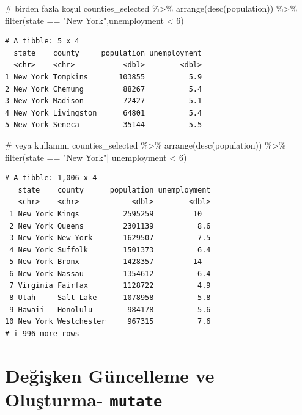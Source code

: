 \documentclass[
  letterpaper,
  DIV=11,
  numbers=noendperiod]{scrreprt}
\newenvironment{Shaded}{\begin{snugshade}}{\end{snugshade}}
\newcommand{\CommentTok}[1]{\textcolor[rgb]{0.37,0.37,0.37}{#1}}
\newcommand{\DecValTok}[1]{\textcolor[rgb]{0.68,0.00,0.00}{#1}}
\newcommand{\FunctionTok}[1]{\textcolor[rgb]{0.28,0.35,0.67}{#1}}
\newcommand{\NormalTok}[1]{\textcolor[rgb]{0.00,0.23,0.31}{#1}}
\newcommand{\SpecialCharTok}[1]{\textcolor[rgb]{0.37,0.37,0.37}{#1}}
\newcommand{\StringTok}[1]{\textcolor[rgb]{0.13,0.47,0.30}{#1}}
\begin{document}
\begin{Shaded}
\begin{Highlighting}[]
\CommentTok{\# birden fazla koşul}
\NormalTok{counties\_selected }\SpecialCharTok{\%\textgreater{}\%}
\FunctionTok{arrange}\NormalTok{(}\FunctionTok{desc}\NormalTok{(population)) }\SpecialCharTok{\%\textgreater{}\%}
\FunctionTok{filter}\NormalTok{(state }\SpecialCharTok{==} \StringTok{"New York"}\NormalTok{,unemployment }\SpecialCharTok{\textless{}} \DecValTok{6}\NormalTok{)}
\end{Highlighting}
\end{Shaded}

\begin{verbatim}
# A tibble: 5 x 4
  state    county     population unemployment
  <chr>    <chr>           <dbl>        <dbl>
1 New York Tompkins       103855          5.9
2 New York Chemung         88267          5.4
3 New York Madison         72427          5.1
4 New York Livingston      64801          5.4
5 New York Seneca          35144          5.5
\end{verbatim}

\begin{Shaded}
\begin{Highlighting}[]
\CommentTok{\# veya kullanımı}
\NormalTok{counties\_selected }\SpecialCharTok{\%\textgreater{}\%}
\FunctionTok{arrange}\NormalTok{(}\FunctionTok{desc}\NormalTok{(population)) }\SpecialCharTok{\%\textgreater{}\%}
\FunctionTok{filter}\NormalTok{(state }\SpecialCharTok{==} \StringTok{"New York"}\SpecialCharTok{|}\NormalTok{ unemployment }\SpecialCharTok{\textless{}} \DecValTok{6}\NormalTok{)}
\end{Highlighting}
\end{Shaded}

\begin{verbatim}
# A tibble: 1,006 x 4
   state    county      population unemployment
   <chr>    <chr>            <dbl>        <dbl>
 1 New York Kings          2595259         10  
 2 New York Queens         2301139          8.6
 3 New York New York       1629507          7.5
 4 New York Suffolk        1501373          6.4
 5 New York Bronx          1428357         14  
 6 New York Nassau         1354612          6.4
 7 Virginia Fairfax        1128722          4.9
 8 Utah     Salt Lake      1078958          5.8
 9 Hawaii   Honolulu        984178          5.6
10 New York Westchester     967315          7.6
# i 996 more rows
\end{verbatim}

\section*{\texorpdfstring{Değişken Güncelleme ve Oluşturma-
\texttt{mutate}}{Değişken Güncelleme ve Oluşturma- mutate}}\label{deux11fiux15fken-guxfcncelleme-ve-oluux15fturma--mutate}
\end{document}

